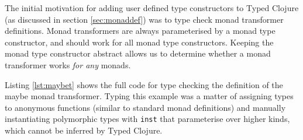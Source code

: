 The initial motivation for adding user defined type constructors to Typed Clojure
(as discussed in section \ref{sec:monaddef}) was to type check
monad transformer definitions.
Monad transformers are always parameterised by a monad type constructor, and should work for all
monad type constructors. Keeping the monad type constructor abstract allows us to determine
whether a monad transformer works \emph{for any} monads.

Listing \ref{lst:maybet} shows the full code for type checking the definition
of the maybe monad transformer.
Typing this example was a matter of assigning types to anonymous functions
(similar to standard monad definitions) and manually instantiating 
polymorphic types with \lstinline|inst|
that parameterise over higher kinds, which cannot be inferred by Typed Clojure.

